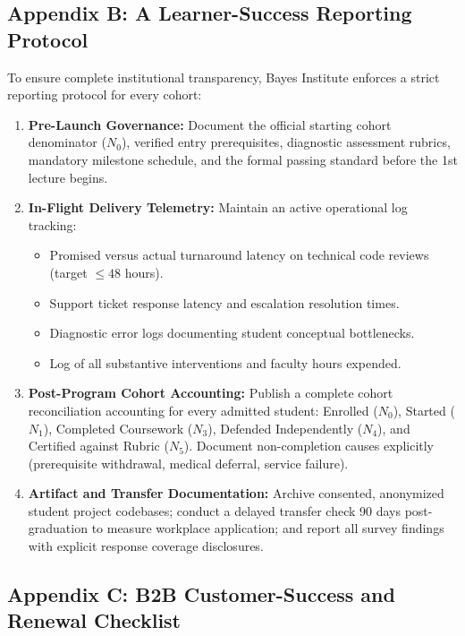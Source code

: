 \subsection*{Appendix B: A Learner-Success Reporting Protocol}

To ensure complete institutional transparency, Bayes Institute enforces a strict reporting protocol for every cohort:
\begin{enumerate}[leftmargin=*]
\item \textbf{Pre-Launch Governance:} Document the official starting cohort denominator ($N_0$), verified entry prerequisites, diagnostic assessment rubrics, mandatory milestone schedule, and the formal passing standard before the 1st lecture begins.
\item \textbf{In-Flight Delivery Telemetry:} Maintain an active operational log tracking:
\begin{itemize}[leftmargin=*]
\item Promised versus actual turnaround latency on technical code reviews (target $\le 48$ hours).
\item Support ticket response latency and escalation resolution times.
\item Diagnostic error logs documenting student conceptual bottlenecks.
\item Log of all substantive interventions and faculty hours expended.
\end{itemize}
\item \textbf{Post-Program Cohort Accounting:} Publish a complete cohort reconciliation accounting for every admitted student: Enrolled ($N_0$), Started ($N_1$), Completed Coursework ($N_3$), Defended Independently ($N_4$), and Certified against Rubric ($N_5$). Document non-completion causes explicitly (prerequisite withdrawal, medical deferral, service failure).
\item \textbf{Artifact and Transfer Documentation:} Archive consented, anonymized student project codebases; conduct a delayed transfer check 90 days post-graduation to measure workplace application; and report all survey findings with explicit response coverage disclosures.
\end{enumerate}

\subsection*{Appendix C: B2B Customer-Success and Renewal Checklist}

